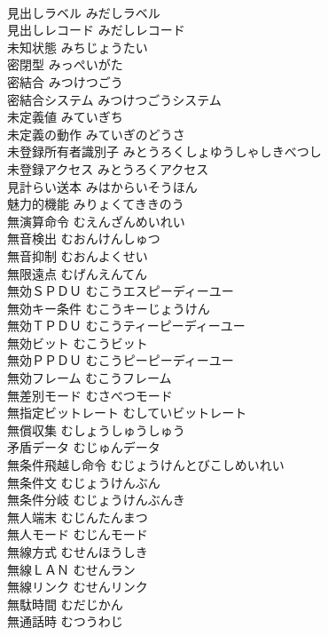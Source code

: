 \documentclass[8pt]{extreport}
\begin{document}
\begin{CJK}{UTF8}{min}
\\	見出しラベル	みだしラベル	
\\	見出しレコード	みだしレコード	
\\	未知状態	みちじょうたい	
\\	密閉型	みっぺいがた	
\\	密結合	みつけつごう	
\\	密結合システム	みつけつごうシステム	
\\	未定義値	みていぎち	
\\	未定義の動作	みていぎのどうさ	
\\	未登録所有者識別子	みとうろくしょゆうしゃしきべつし	
\\	未登録アクセス	みとうろくアクセス	
\\	見計らい送本	みはからいそうほん	
\\	魅力的機能	みりょくてききのう	
\\	無演算命令	むえんざんめいれい	
\\	無音検出	むおんけんしゅつ	
\\	無音抑制	むおんよくせい	
\\	無限遠点	むげんえんてん	
\\	無効ＳＰＤＵ	むこうエスピーディーユー	
\\	無効キー条件	むこうキーじょうけん	
\\	無効ＴＰＤＵ	むこうティーピーディーユー	
\\	無効ビット	むこうビット	
\\	無効ＰＰＤＵ	むこうピーピーディーユー	
\\	無効フレーム	むこうフレーム	
\\	無差別モード	むさべつモード	
\\	無指定ビットレート	むしていビットレート	
\\	無償収集	むしょうしゅうしゅう	
\\	矛盾データ	むじゅんデータ	
\\	無条件飛越し命令	むじょうけんとびこしめいれい	
\\	無条件文	むじょうけんぶん	
\\	無条件分岐	むじょうけんぶんき	
\\	無人端末	むじんたんまつ	
\\	無人モード	むじんモード	
\\	無線方式	むせんほうしき	
\\	無線ＬＡＮ	むせんラン	
\\	無線リンク	むせんリンク	
\\	無駄時間	むだじかん	
\\	無通話時	むつうわじ	

\end{CJK}
\end{document}
